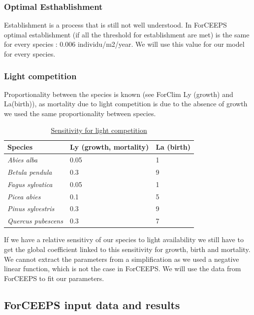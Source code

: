 \documentclass{article}
\begin{document}
\subsubsection{Optimal Esthablishment}

Establishment is a process that is still not well understood. In ForCEEPS optimal establishment (if all the threshold for establishment are met) is the same for every species : 0.006 individu/m2/year. We will use this value for our model for every species.

\subsubsection {Light competition}

Proportionality between the species is known (see ForClim Ly (growth) and La(birth)), as mortality due to light competition is due to the absence of growth we used the same proportionality between species.

\begin{table}[H]
\begin{center}
    \begin{tabular}{lll}
    \hline
    Species & Ly (growth, mortality) & La (birth) \\ \hline
    \textit{Abies alba} & 0.05 & 1 \\
    \textit{Betula pendula} & 0.3 & 9 \\
    \textit{Fagus sylvatica} & 0.05 & 1 \\
    \textit{Picea abies} & 0.1 & 5 \\
    \textit{Pinus sylvestris} & 0.3 & 9 \\
    \textit{Quercus pubescens} & 0.3 & 7 \\ \hline
    \end{tabular}
    \caption{\underline{Sensitivity for light competition}}
    \label{tab:prop_sensitivity}
\end{center}
\end{table}

If we have a relative sensitivy of our species to light availability we still have to get the global coefficient linked to this sensitivity for growth, birth and mortality. We cannot extract the parameters from a simplification as we used a negative linear function, which is not the case in ForCEEPS. We will use the data from ForCEEPS to fit our parameters.

\subsection{ForCEEPS input data and results}
\end{document}
